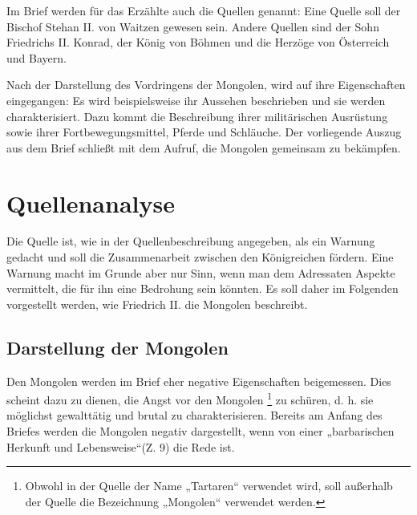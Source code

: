 \documentclass{../../sem_paper}
\begin{document}
Im Brief werden für das Erzählte auch die Quellen genannt: Eine Quelle soll der
Bischof Stehan II. von Waitzen gewesen sein. Andere Quellen sind der Sohn Friedrichs
II. Konrad, der König von Böhmen und die Herzöge von Österreich und Bayern.

Nach der Darstellung des Vordringens der Mongolen, wird auf ihre Eigenschaften
eingegangen: Es wird beispielsweise ihr Aussehen beschrieben und sie werden
charakterisiert. Dazu kommt die Beschreibung ihrer militärischen Ausrüstung sowie
ihrer Fortbewegungsmittel, Pferde und Schläuche. Der vorliegende Auszug aus dem
Brief schließt mit dem Aufruf, die Mongolen gemeinsam zu bekämpfen.

\section{Quellenanalyse}
Die Quelle ist, wie in der Quellenbeschreibung angegeben, als ein Warnung gedacht
und soll die Zusammenarbeit zwischen den Königreichen fördern. Eine Warnung macht
im Grunde aber nur Sinn, wenn man dem Adressaten Aspekte vermittelt, die für ihn eine
Bedrohung sein könnten. Es soll daher im Folgenden vorgestellt werden, wie Friedrich
II. die Mongolen beschreibt.

\subsection{Darstellung der Mongolen}
Den Mongolen werden im Brief eher negative Eigenschaften beigemessen. Dies
scheint dazu zu dienen, die Angst vor den Mongolen
\footnote{Obwohl in der Quelle der Name „Tartaren“ verwendet wird, soll außerhalb der Quelle die
Bezeichnung „Mongolen“ verwendet werden.} 
zu schüren, d. h. sie möglichst
gewalttätig und brutal zu charakterisieren. Bereits am Anfang des Briefes werden die
Mongolen negativ dargestellt, wenn von einer „barbarischen Herkunft und
Lebensweise“(Z. 9) die Rede ist.
\end{document}
